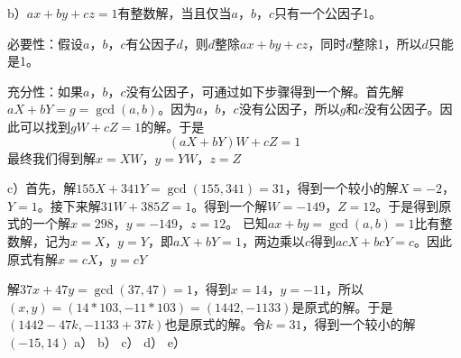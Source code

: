 b）$ax+by+cz=1$有整数解，当且仅当$a$，$b$，$c$只有一个公因子1。\par
\proof 必要性：假设$a$，$b$，$c$有公因子$d$，则$d$整除$ax+by+cz$，同时$d$整除1，所以$d$只能是1。\par
充分性：如果$a$，$b$，$c$没有公因子，可通过如下步骤得到一个解。首先解$aX+bY=g=\gcd(a,b)$。因为$a$，$b$，$c$没有公因子，所以$g$和$c$没有公因子。因此可以找到$gW+cZ=1$的解。于是
\[(aX+bY)W +cZ=1\]
最终我们得到解$x=XW$，$y=YW$，$z=Z$\par
c）首先，解$155X+341Y=\gcd(155, 341)=31$，得到一个较小的解$X=-2$，$Y=1$。接下来解$31W+385Z=1$。得到一个解$W=-149$，$Z=12$。于是得到原式的一个解$x=298$，$y=-149$，$z=12$。
%
\exercise \proof 已知$ax+by=\gcd(a,b)=1$比有整数解，记为$x=X$，$y=Y$，即$aX+bY=1$，两边乘以$c$得到$acX+bcY=c$。因此原式有解$x=cX$，$y=cY$\par
解$37x+47y=\gcd(37, 47)=1$，得到$x=14$，$y=-11$，所以$(x,y)=(14*103, -11*103)=(1442, -1133)$是原式的解。于是$(1442 - 47k, -1133+37k)$也是原式的解。令$k=31$，得到一个较小的解$(-15, 14)$
%
\exercise a）
b）
c）
d）
e）